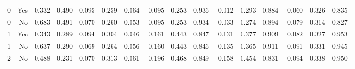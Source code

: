 \begin{tabular}{*{16}{r}}
0 & Yes & 0.332 & 0.490 & 0.095 & 0.259 & 0.064 & 0.095 & 0.253 & 0.936 & -0.012 & 0.293 & 0.884 & -0.060 & 0.326 & 0.835 \\ 
0 & No & 0.683 & 0.491 & 0.070 & 0.260 & 0.053 & 0.095 & 0.253 & 0.934 & -0.033 & 0.274 & 0.894 & -0.079 & 0.314 & 0.827 \\ 
1 & Yes & 0.343 & 0.289 & 0.094 & 0.304 & 0.046 & -0.161 & 0.443 & 0.847 & -0.131 & 0.377 & 0.909 & -0.082 & 0.327 & 0.953 \\ 
1 & No & 0.637 & 0.290 & 0.069 & 0.264 & 0.056 & -0.160 & 0.443 & 0.846 & -0.135 & 0.365 & 0.911 & -0.091 & 0.331 & 0.945 \\ 
2 & No & 0.488 & 0.231 & 0.070 & 0.313 & 0.061 & -0.196 & 0.468 & 0.849 & -0.158 & 0.454 & 0.831 & -0.094 & 0.338 & 0.950 \\ 
\bottomrule 
 \end{tabular}
